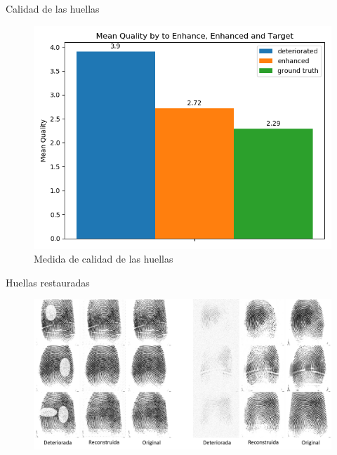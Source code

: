 \documentclass[12pt,aspectratio=169]{beamer}
\begin{document}
\begin{frame}{Calidad de las huellas}

    \begin{figure}
        \includegraphics[scale=0.54]{figs/mean_qualities.png}
        \caption{Medida de calidad de las huellas}
    \end{figure}
    
\end{frame}

\begin{frame}{Huellas restauradas}

    \begin{figure}
        \includegraphics[scale=0.38]{figs/reconstruccion_labels.png}
    \end{figure}

\end{frame}
\end{document}
